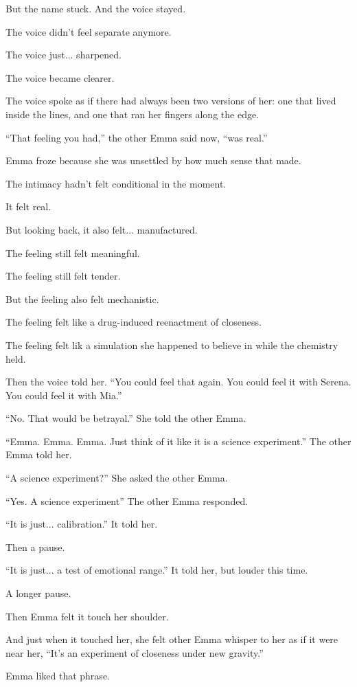 But the name stuck. And the voice stayed. 

The voice didn’t feel separate anymore.  

The voice just... sharpened. 

The voice became clearer. 

The voice spoke as if there had always been two versions of her: one that lived inside the lines, 
and one that ran her fingers along the edge.

``That feeling you had,'' the other Emma said now, ``was real.''

Emma froze because she was unsettled by how much sense that made.

The intimacy hadn’t felt conditional in the moment. 

It felt real. 

But looking back, it also felt... manufactured. 

The feeling still felt meaningful.

The feeling still felt tender. 

But the feeling also felt mechanistic.

The feeling felt like a drug-induced reenactment of closeness. 

The feeling felt lik a simulation she happened to believe in while the chemistry held.

Then the voice told her. ``You could feel that again. You could feel it with Serena.  
You could feel it with Mia.''

``No. That would be betrayal.'' She told the other Emma.

``Emma. Emma. Emma. Just think of it like it is a science experiment.'' The other Emma told her.

``A science experiment?'' She asked the other Emma.

``Yes. A science experiment'' The other Emma responded.

``It is just... calibration.'' It told her.

Then a pause.

``It is just... a test of emotional range.'' It told her, but louder this time.

A longer pause.

Then Emma felt it touch her shoulder. 

And just when it touched her, she felt other Emma whisper to her as if it were near her,
``It's an experiment of closeness under new gravity.''

Emma liked that phrase. 

